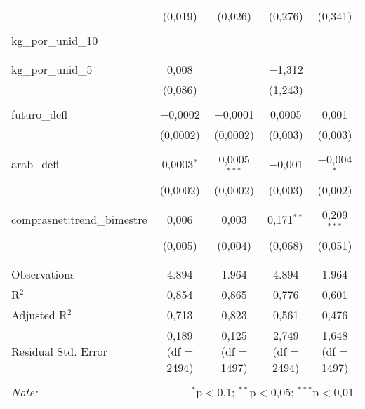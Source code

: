 \begin{table}[!htbp]
\begin{tabular}{@{\extracolsep{5pt}}lcccc}
  & (0,019) & (0,026) & (0,276) & (0,341) \\ 
  & & & & \\ 
 kg\_por\_unid\_10 &  &  &  &  \\ 
  &  &  &  &  \\ 
  & & & & \\ 
 kg\_por\_unid\_5 & 0,008 &  & $-$1,312 &  \\ 
  & (0,086) &  & (1,243) &  \\ 
  & & & & \\ 
 futuro\_defl & $-$0,0002 & $-$0,0001 & 0,0005 & 0,001 \\ 
  & (0,0002) & (0,0002) & (0,003) & (0,003) \\ 
  & & & & \\ 
 arab\_defl & 0,0003$^{*}$ & 0,0005$^{***}$ & $-$0,001 & $-$0,004$^{*}$ \\ 
  & (0,0002) & (0,0002) & (0,003) & (0,002) \\ 
  & & & & \\ 
 comprasnet:trend\_bimestre & 0,006 & 0,003 & 0,171$^{**}$ & 0,209$^{***}$ \\ 
  & (0,005) & (0,004) & (0,068) & (0,051) \\ 
  & & & & \\ 
\hline \\[-1.8ex] 
Observations & 4.894 & 1.964 & 4.894 & 1.964 \\ 
R$^{2}$ & 0,854 & 0,865 & 0,776 & 0,601 \\ 
Adjusted R$^{2}$ & 0,713 & 0,823 & 0,561 & 0,476 \\ 
Residual Std. Error & 0,189 (df = 2494) & 0,125 (df = 1497) & 2,749 (df = 2494) & 1,648 (df = 1497) \\ 
\hline 
\hline \\[-1.8ex] 
\textit{Note:}  & \multicolumn{4}{r}{$^{*}$p$<$0,1; $^{**}$p$<$0,05; $^{***}$p$<$0,01} \\ 
\end{tabular} 
\end{table} 
